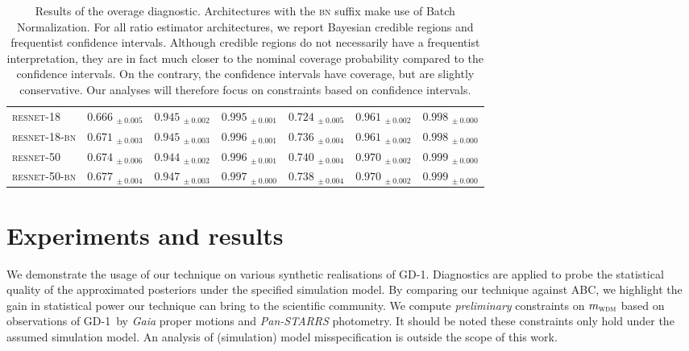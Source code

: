 \documentclass[fleqn,usenatbib]{mnras}
\begin{document}
\begin{table}
\begin{tabular}{lllllll}
        \textsc{resnet-18} & $0.666_{~\pm0.005}$ & $0.945_{~\pm0.002}$ & $0.995_{~\pm0.001}$ & $0.724_{~\pm0.005}$ & $0.961_{~\pm0.002}$ & $0.998_{~\pm0.000}$ \\
        \textsc{resnet-18-bn} & $0.671_{~\pm0.003}$ & $0.945_{~\pm0.003}$ & $0.996_{~\pm0.001}$ & $0.736_{~\pm0.004}$ & $0.961_{~\pm0.002}$ & $0.998_{~\pm0.000}$ \\
        \textsc{resnet-50} & $0.674_{~\pm0.006}$ & $0.944_{~\pm0.002}$ & $0.996_{~\pm0.001}$ & $0.740_{~\pm0.004}$ & $0.970_{~\pm0.002}$ & $0.999_{~\pm0.000}$ \\
        \textsc{resnet-50-bn} & $0.677_{~\pm0.004}$ & $0.947_{~\pm0.003}$ & $0.997_{~\pm0.000}$ & $0.738_{~\pm0.004}$ & $0.970_{~\pm0.002}$ & $0.999_{~\pm0.000}$ \\
        \bottomrule
    \end{tabular}
    \caption{
        Results of the overage diagnostic. Architectures with the \textsc{bn} suffix make use of Batch Normalization.
        For all ratio estimator architectures, we report Bayesian credible regions and frequentist confidence intervals.
        Although credible regions do not necessarily have a frequentist interpretation, they are in fact much closer to the nominal coverage probability compared to the
        confidence intervals. On the contrary, the confidence
        intervals have coverage, but are slightly conservative. 
        Our analyses will therefore focus on constraints based on confidence intervals.
        \protect{}
    }
    \label{table:coverage}
\end{table}

\section{Experiments and results}
\label{sec:experiments}
We demonstrate the usage of our technique on
various synthetic realisations of GD-1.
Diagnostics are applied to probe the statistical quality of the approximated posteriors
under the specified simulation model. By comparing our technique against ABC,
we highlight the gain in statistical power our technique can bring to the scientific community.
We compute \emph{preliminary} constraints on $m_\textsc{wdm}$
based on observations of GD-1~by \emph{Gaia} proper motions \citep{gaia,2016A&A...595A...1G}
and \emph{Pan-STARRS} photometry. %
It should be noted
these constraints only hold under the assumed
simulation model. An analysis of
(simulation) model misspecification is outside the scope of this work.
\end{document}
